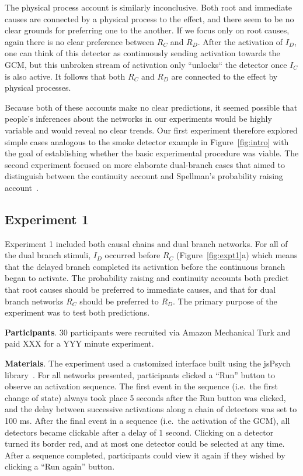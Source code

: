 \documentclass[10pt,letterpaper]{article}
\newcommand{\ev}[2]{$#1_#2$}
\begin{document}
The physical process account is similarly inconclusive. Both root and immediate causes are connected by a physical process to the effect, and there seem to be no clear grounds for preferring one to the another. If we focus only on root causes, again there is no clear preference between \ev{R}{C} and \ev{R}{D}. After the activation of \ev{I}{D}, one can think of this detector as continuously sending activation towards the GCM, but this unbroken stream of activation only ``unlocks`` the detector once \ev{I}{C} is also active. It follows that both \ev{R}{C} and \ev{R}{D} are connected to the effect by physical processes.

Because both of these accounts make no clear predictions, it seemed possible that people's inferences about the networks in our experiments would be highly variable and would reveal no clear trends. Our first experiment therefore explored simple cases analogous to the smoke detector example in Figure~\ref{fig:intro} with the goal of establishing whether the basic experimental procedure was viable.  The second experiment focused on more elaborate dual-branch cases that aimed to distinguish between the continuity account and Spellman's probability raising account~\cite{spellman97}.

\subsection{Experiment 1}

Experiment 1 included both causal chains and dual branch networks. For all of the dual branch stimuli, \ev{I}{D} occurred before \ev{R}{C} (Figure~\ref{fig:expt1}a) which means that the delayed branch completed its activation before the continuous branch began to activate. The probability raising and continuity accounts both predict that root causes should be preferred to immediate causes, and that for dual branch networks \ev{R}{C} should be preferred to \ev{R}{D}. The primary purpose of the experiment was to test both predictions. 

\textbf{Participants}. 30 participants were recruited via Amazon Mechanical Turk and paid XXX for a YYY minute experiment.



\textbf{Materials}. The experiment used a customized interface built using the jsPsych library~\cite{XXX}. For all networks presented, participants clicked a ``Run'' button to observe an activation sequence. The first event in the sequence (i.e.\ the first change of state) always took place 5 seconds after the Run button was clicked, and the delay between successive activations along a chain of detectors was set to 100 ms. After the final event in a sequence (i.e.\ the activation of the GCM), all detectors became clickable after a delay of 1 second. Clicking on a detector turned its border red, and at most one detector could be selected at any time. After a sequence completed, participants could view it again if they wished by clicking a ``Run again'' button.
\end{document}
